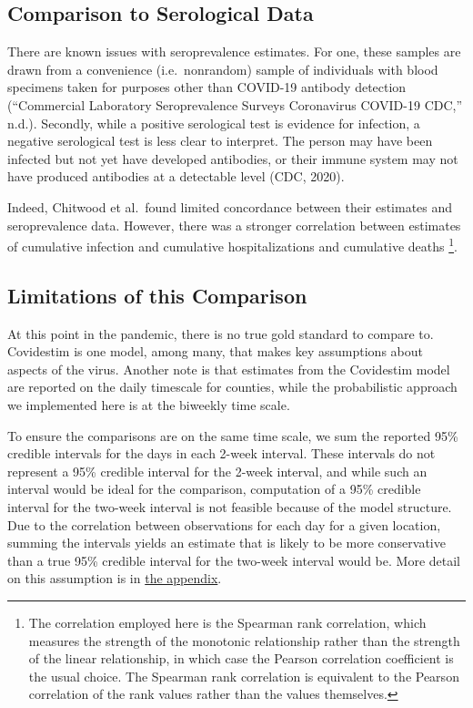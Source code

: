 \documentclass[12pt,twoside]{smiththesis}
\begin{document}
\hypertarget{comparison-to-serological-data}{%
\subsection{Comparison to Serological Data}\label{comparison-to-serological-data}}

There are known issues with seroprevalence estimates. For one, these samples are drawn from a convenience (i.e.~nonrandom) sample of individuals with blood specimens taken for purposes other than COVID-19 antibody detection ({``Commercial {Laboratory Seroprevalence Surveys} \textbar{} {Coronavirus} \textbar{} {COVID-19} \textbar{} {CDC},''} n.d.). Secondly, while a positive serological test is evidence for infection, a negative serological test is less clear to interpret. The person may have been infected but not yet have developed antibodies, or their immune system may not have produced antibodies at a detectable level (CDC, 2020).

Indeed, Chitwood et al.~found limited concordance between their estimates and seroprevalence data. However, there was a stronger correlation between estimates of cumulative infection and cumulative hospitalizations and cumulative deaths \footnote{The correlation employed here is the Spearman rank correlation, which measures the strength of the monotonic relationship rather than the strength of the linear relationship, in which case the Pearson correlation coefficient is the usual choice. The Spearman rank correlation is equivalent to the Pearson correlation of the rank values rather than the values themselves. }.

\hypertarget{lims}{%
\subsection{Limitations of this Comparison}\label{lims}}

At this point in the pandemic, there is no true gold standard to compare to. Covidestim is one model, among many, that makes key assumptions about aspects of the virus. Another note is that estimates from the Covidestim model are reported on the daily timescale for counties, while the probabilistic approach we implemented here is at the biweekly time scale.

To ensure the comparisons are on the same time scale, we sum the reported 95\% credible intervals for the days in each 2-week interval. These intervals do not represent a 95\% credible interval for the 2-week interval, and while such an interval would be ideal for the comparison, computation of a 95\% credible interval for the two-week interval is not feasible because of the model structure. Due to the correlation between observations for each day for a given location, summing the intervals yields an estimate that is likely to be more conservative than a true 95\% credible interval for the two-week interval would be. More detail on this assumption is in \protect\hyperlink{conservativeintervals}{the appendix}.
\end{document}
